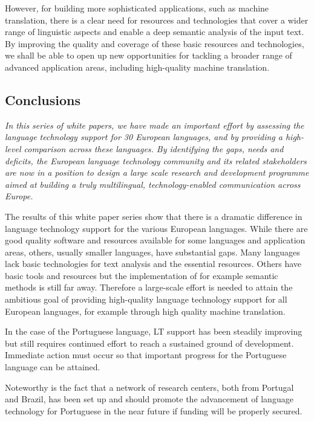 \begin{multicols}{2}
However, for building more sophisticated applications, such as machine translation, there is a clear need for resources and technologies that cover a wider range of linguistic aspects and enable a deep semantic analysis of the input text. By improving the quality and coverage of these basic resources and technologies, we shall be able to open up new opportunities for tackling a broader range of advanced application areas, including high-quality machine translation.

\subsection{Conclusions}

\emph{In this series of white papers, we have made an important effort by assessing the language technology support for 30 European languages, and by providing a high-level comparison across these languages. By identifying the gaps, needs and deficits, the European language technology community and its related stakeholders are now in a position to design a large scale research and development programme aimed at building a truly multilingual, technology-enabled communication across Europe.}

The results of this white paper series show that there is a dramatic difference in language technology support for the various European languages. While there are good quality software and resources available for some languages and application areas, others, usually smaller languages, have substantial gaps. Many languages lack basic technologies for text analysis and the essential resources. Others have basic tools and resources but the implementation of for example semantic methods is still far away. Therefore a large-scale effort is needed to attain the ambitious goal of providing high-quality language technology support for all European languages, for example through high quality machine translation. 

   In the case of the Portuguese language, LT support has been steadily improving but still requires continued effort to reach a sustained ground of development. Immediate action must occur so that important progress for the Portuguese language can be attained.

  Noteworthy is the fact that a network of research centers, both from Portugal and Brazil, has been set up and should promote the advancement of language technology for Portuguese in the near future if funding will be properly secured.


\end{multicols}
